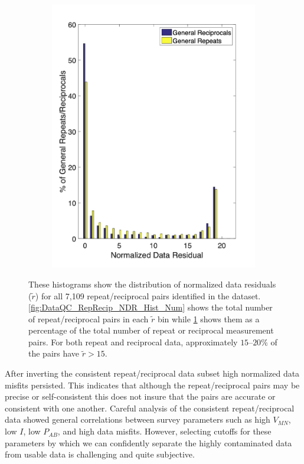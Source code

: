 \documentclass[final,authoryear,5p,times,twocolumn]{elsarticle}
\begin{document}
\begin{figure}[!ht]
\begin{subfigure}[b]{0.475\linewidth}
       \includegraphics[trim=0.2cm 1cm 2cm 1.8cm, clip=true, width=\linewidth]{./Figures/Fig6b.png}
       \caption{}
       \label{fig:DataQC_RepRecip_NDR_Hist_Perc}
   \end{subfigure}
   \caption{These histograms show the distribution of normalized data residuals ($\tilde{r}$) for all 7,109 repeat/reciprocal pairs identified in the dataset. \ref{fig:DataQC_RepRecip_NDR_Hist_Num} shows the total number of repeat/reciprocal pairs in each $\tilde{r}$ bin while \ref{fig:DataQC_RepRecip_NDR_Hist_Perc} shows them as a percentage of the total number of repeat or reciprocal measurement pairs. For both repeat and reciprocal data, approximately $15$--$20\%$ of the pairs have $\tilde{r} > 15$.}
   \label{fig:DataQC_RepRecip_NDR_Hist}
\end{figure}


After inverting the consistent repeat/reciprocal data subset high normalized data misfits persisted. This indicates that although the repeat/reciprocal pairs may be precise or self-consistent this does not insure that the pairs are accurate or consistent with one another. Careful analysis of the consistent repeat/reciprocal data showed general correlations between survey parameters such as high $V_{MN}$, low $I$, low $P_{AB}$, and high data misfits. However, selecting cutoffs for these parameters by which we can confidently separate the highly contaminated data from usable data is challenging and quite subjective.
\end{document}
